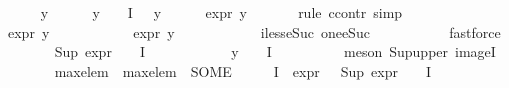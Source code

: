 \begin{isabellebody}
\ \ \ \ \isamarkupfalse%
\ y\isanewline
\ \ \ \ \isamarkupfalse%
\ {\isachardoublequoteopen}y\ {\isasymin}\ {\isasymPhi}\ {\isacharbackquote}{\kern0pt}\ I{\isachardoublequoteclose}\ {\isachardoublequoteopen}{\isasympsi}\ {\isasymnoteq}\ y{\isachardoublequoteclose}\isanewline
\ \ \ \ \isamarkupfalse%
\ {\isachardoublequoteopen}expr{\isacharunderscore}{\kern0pt}{}\ y\ {\isasymle}\ {}{\isachardoublequoteclose}\isanewline
\ \ \ \ \isamarkupfalse%
{\isacharparenleft}{\kern0pt}rule\ ccontr{\isacharcomma}{\kern0pt}\ simp{\isacharparenright}{\kern0pt}\isanewline
\ \ \ \ \ \ \isamarkupfalse%
\ {\isachardoublequoteopen}expr{\isacharunderscore}{\kern0pt}{}\ y\ {\isasymnoteq}\ {}{\isachardoublequoteclose}\isanewline
\ \ \ \ \ \ \isamarkupfalse%
\ \isamarkupfalse%
\ {\isachardoublequoteopen}expr{\isacharunderscore}{\kern0pt}{}\ y\ {\isasymge}\ {}{\isachardoublequoteclose}\isanewline
\ \ \ \ \ \ \ \ \isamarkupfalse%
\ iless{\isacharunderscore}{\kern0pt}eSuc{}\ one{\isacharunderscore}{\kern0pt}eSuc\ \isanewline
\ \ \ \ \ \ \ \ \isamarkupfalse%
\ fastforce\isanewline
\ \ \ \ \ \ \isamarkupfalse%
\ {\isachardoublequoteopen}{\isacharparenleft}{\kern0pt}Sup\ {\isacharparenleft}{\kern0pt}expr{\isacharunderscore}{\kern0pt}{}\ {\isacharbackquote}{\kern0pt}\ {\isacharparenleft}{\kern0pt}{\isasymPhi}\ {\isacharbackquote}{\kern0pt}\ I{\isacharparenright}{\kern0pt}{\isacharparenright}{\kern0pt}{\isacharparenright}{\kern0pt}\ {\isasymge}\ {}{\isachardoublequoteclose}\isanewline
\ \ \ \ \ \ \ \ \isamarkupfalse%
\ {\isacartoucheopen}y\ {\isasymin}\ {\isasymPhi}\ {\isacharbackquote}{\kern0pt}\ I{\isacartoucheclose}\isanewline
\ \ \ \ \ \ \ \ \isamarkupfalse%
\ {\isacharparenleft}{\kern0pt}meson\ Sup{\isacharunderscore}{\kern0pt}upper{}\ imageI{\isacharparenright}{\kern0pt}\isanewline
\ \ \ \ \ \ \isamarkupfalse%
\ max{\isacharunderscore}{\kern0pt}elem\ \ {\isachardoublequoteopen}max{\isacharunderscore}{\kern0pt}elem\ {\isasymequiv}\ {\isacharparenleft}{\kern0pt}SOME\ {\isasympsi}{\isachardot}{\kern0pt}\ {\isasympsi}\ {\isasymin}\ {\isacharparenleft}{\kern0pt}{\isasymPhi}\ {\isacharbackquote}{\kern0pt}\ I{\isacharparenright}{\kern0pt}\ {\isasymand}\ expr{\isacharunderscore}{\kern0pt}{}\ {\isasympsi}\ {\isacharequal}{\kern0pt}\ {\isacharparenleft}{\kern0pt}Sup\ {\isacharparenleft}{\kern0pt}expr{\isacharunderscore}{\kern0pt}{}\ {\isacharbackquote}{\kern0pt}\ {\isacharparenleft}{\kern0pt}{\isasymPhi}\ {\isacharbackquote}{\kern0pt}\ I{\isacharparenright}{\kern0pt}{\isacharparenright}{\kern0pt}{\isacharparenright}{\kern0pt}{\isacharparenright}{\kern0pt}{\isachardoublequoteclose}\isanewline

\end{isabellebody}
